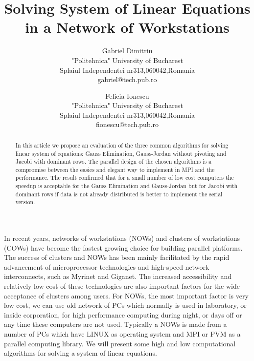 \documentclass[times,10pt,twocolumn]{article}
\begin{document}
\title{Solving System of Linear Equations in a Network of Workstations}
\author{Gabriel Dimitriu \\
"Politehnica" University of Bucharest\\
Splaiul Independentei nr313,060042,Romania\\
gabriel@tech.pub.ro\\
\and Felicia Ionescu \\
"Politehnica" University of Bucharest\\
Splaiul Independentei nr313,060042,Romania\\
 fionescu@tech.pub.ro
}
\maketitle

\begin{abstract}
In this article we propose an evaluation of the three common algorithms 
for solving linear system of equations: Gauss Elimination, Gauss-Jordan 
without pivoting and Jacobi with dominant rows. The parallel design of 
the chosen algorithms is a compromise between the easies and elegant 
way to implement in MPI and the performance. The result confirmed that 
for a small number of low cost computers the speedup is acceptable for 
the Gauss Elimination and Gauss-Jordan but for Jacobi with dominant rows 
if data is not already distributed is better to implement the serial version.
\end{abstract}

\thispagestyle{empty}


In recent years, networks of workstations (NOWs) and clusters of
workstations (COWs) have become the fastest growing choice for
building parallel platforms. The success of clusters and NOWs has
been mainly facilitated by the rapid advancement of microprocessor
technologies and high-speed network interconnects, such as Myrinet
and Giganet. The increased accessibility and relatively low cost
of these technologies are also important factors for the wide
acceptance of clusters among users. For NOWs, the most important
factor is very low cost, we can use old network of PCs which
normally is used in laboratory, or inside corporation, for high
performance computing during night, or days off or any time these
computers are not used. Typically a NOWs is made from a number of
PCs which have LINUX as operating system and MPI or PVM as a
parallel computing library. We will present some high and low
computational algorithms for solving a system of linear equations.
\end{document}
